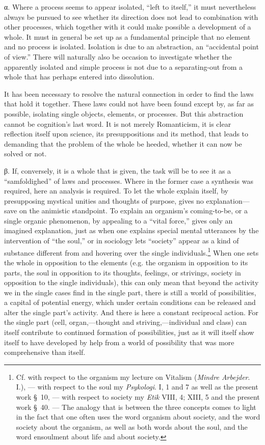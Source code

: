 \documentclass[12pt,a4paper]{book}
\newcommand{\opage}[1]{\marginnote{\footnotesize\textit{[#1]}}}
\begin{document}
α. Where a process seems to appear isolated, ``left to itself,'' it must
nevertheless always be pursued to see whether its direction does not lead to
combination with other processes, which together with it could make possible a
development of a whole. It must in general be set up as a fundamental principle
that no element and no process is isolated. Isolation is due to an abstraction, an
``accidental point of view.'' There will naturally also be occasion to investigate
whether the apparently isolated and simple process is not due to a separating-out
from a whole that has perhaps entered into dissolution.

It has been necessary to resolve the natural connection in order to find the laws
that hold it together. These laws could not have been found except by, as far as
possible, isolating single objects, elements, or processes. But this abstraction
cannot be cognition's last word. It is not merely Romanticism, it is clear
reflection itself upon science, its presuppositions and its method, that leads to
demanding that the problem of the whole be heeded, whether it can now be solved or
not.

β. If, conversely, it is a whole that is given, the task will be to see it as a
``samfoldighed'' of laws and processes. Where in the former case a synthesis was
required, here an analysis is required. To let the whole explain itself, by
presupposing mystical unities and thoughts of purpose, gives no explanation---save
on the animistic standpoint. To explain an organism's coming-to-be, or a single
organic phenomenon, by appealing to a ``vital force,'' gives only an imagined
explanation, just as when one explains special mental utterances by the
intervention of ``the soul,'' or in sociology lets ``society'' appear as a kind of
substance different from and hovering over the single individuals.\footnote{Cf.
with respect to the organism my lecture on Vitalism (\emph{Mindre Arbejder}. I.),
--- with respect to the soul my \emph{Psykologi}. I, 1 and 7 as well as the present
work \S\ 10, --- with respect to society my \emph{Etik} VIII, 4; XIII, 5 and the
present work \S\ 40. --- The analogy that is between the three concepts comes to
light in the fact that one often uses the word organism about society, and the word
society about the organism, as well as both words about the soul, and the word
ensoulment about life and about society.} When \opage{290}one sets the whole in opposition to
the elements (e.g. the organism in opposition to its parts, the soul in opposition
to its thoughts, feelings, or strivings, society in opposition to the single
individuals), this can only mean that beyond the activity we in the single cases
find in the single part, there is still a world of possibilities, a capital of
potential energy, which under certain conditions can be released and alter the
single part's activity. And there is here a constant reciprocal action. For the
single part (cell, organ,---thought and striving,---individual and class) can itself
contribute to continued formation of possibilities, just as it will itself show
itself to have developed by help from a world of possibility that was more
comprehensive than itself.
\end{document}
